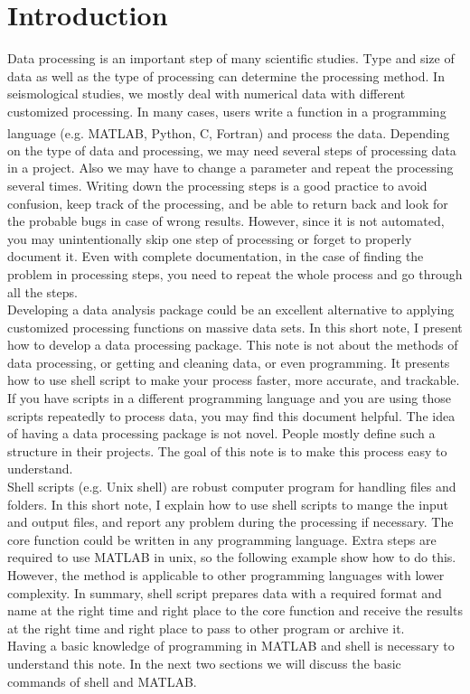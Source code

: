 \section{Introduction}
Data processing is an important step of many scientific studies. Type and size of data as well as the type of processing can determine the processing method. In seismological studies, we mostly deal with numerical data with different customized processing. In many cases, users write a function in a programming language (e.g. MATLAB\textsuperscript{\textregistered}, Python, C, Fortran) and process the data. Depending on the type of data and processing, we may need several steps of processing data in a project. Also we may have to change a parameter and repeat the processing several times.  Writing down the processing steps is a good practice to avoid confusion, keep track of the processing, and be able to return back and look for the probable bugs in case of wrong results. However, since it is not automated, you may unintentionally skip one step of processing or forget to properly document it. Even with complete documentation, in the case of finding the problem in processing steps, you need to repeat the whole process and go through all the steps. \\
Developing a data analysis package could be an excellent alternative to applying customized processing functions on massive data sets. In this short note, I present how to develop a data processing package. This note is not about the methods of data processing, or getting and cleaning data, or even programming. It presents how to use shell script to make your process faster, more accurate, and trackable. If you have  scripts in a different programming language and you are using those scripts repeatedly to process data, you may find this document helpful. The idea of having a data processing package is not novel. People mostly define such a structure in their projects. The goal of this note is to make this process easy to understand.\\
 Shell scripts (e.g. Unix shell) are robust computer program for handling files and folders. In this short note, I explain how to use shell scripts to mange the input and output files, and report any problem during the processing if necessary. The core function could be written in any programming language. Extra steps are required to use MATLAB in unix, so the following example show how to do this. However, the method is applicable to other programming languages with lower complexity. In summary, shell script prepares  data with a required format and name at the right time and right place to the core function and receive the results at the right time and right place to pass to other program or archive it.\\
Having a basic knowledge of programming in MATLAB and shell is necessary to understand this note. In the next two sections we will discuss the basic commands of shell and MATLAB. 

